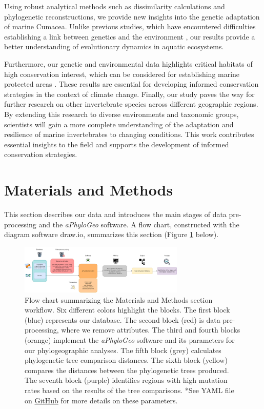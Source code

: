 Using robust analytical methods such as dissimilarity calculations and phylogenetic reconstructions, we provide new insights into the genetic adaptation of marine Cumacea. Unlike previous studies, which have encountered difficulties establishing a link between genetics and the environment \citep{manel2003landscape, balkenhol2009statistical}, our results provide a better understanding of evolutionary dynamics in aquatic ecosystems.

Furthermore, our genetic and environmental data highlights critical habitats of high conservation interest, which can be considered for establishing marine protected areas \citep{levin2009ecological}. These results are essential for developing informed conservation strategies in the context of climate change. Finally, our study paves the way for further research on other invertebrate species across different geographic regions. By extending this research to diverse environments and taxonomic groups, scientists will gain a more complete understanding of the adaptation and resilience of marine invertebrates to changing conditions. This work contributes essential insights to the field and supports the development of informed conservation strategies.

\section{Materials and Methods}\label{materials-methods}
This section describes our data and introduces the main stages of data pre-processing and the \textit{aPhyloGeo} software. A flow chart, constructed with the diagram software draw.io, summarizes this section (Figure \ref{fig:fig1} below).

\begin{figure}[htbp]
    \centering
    \includegraphics[width=0.7\textwidth]{diagram.drawio.png}
    \caption{Flow chart summarizing the Materials and Methods section workflow. Six different colors highlight the blocks. The first block (blue) represents our database. The second block (red) is data pre-processing, where we remove attributes. The third and fourth blocks (orange) implement the \textit{aPhyloGeo} software and its parameters for our phylogeographic analyses. The fifth block (grey) calculates phylogenetic tree comparison distances. The sixth block (yellow) compares the distances between the phylogenetic trees produced. The seventh block (purple) identifies regions with high mutation rates based on the results of the tree comparisons. *See YAML file on \href{https://github.com/tahiri-lab/aPhyloGeo}{GitHub} for more details on these parameters. \label{fig:fig1}}
\end{figure}

